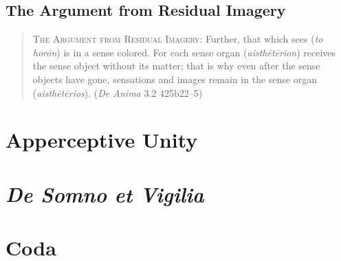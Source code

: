 
\subsection{The Argument from Residual Imagery} %
\label{sub:the_argument_from_residual_imagery}

\begin{quote}
	\textsc{The Argument from Residual Imagery}: Further, that which sees (\emph{to horōn}) is in a sense colored. For each sense organ (\emph{aisthētērion}) receives the sense object without its matter; that is why even after the sense objects have gone, sensations and images remain in the sense organ (\emph{aisthētēríos}). (\emph{De Anima} 3.2 425b22–5)
\end{quote}



\section{Apperceptive Unity} %
\label{sec:apperceptive_unity}


\section{\emph{De Somno et Vigilia}} %
\label{sec:_emph_de_somno_et_vigilia}


\section{Coda} %
\label{sec:coda2}


